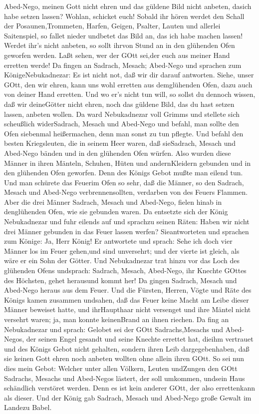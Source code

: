 Abed-Nego, meinen Gott nicht ehren und das güldene Bild nicht anbeten,
dasich habe setzen lassen?  Wohlan, schicket euch! Sobald
ihr hören werdet den Schall der Posaunen,Trommeten, Harfen, Geigen,
Psalter, Lauten und allerlei Saitenspiel, so fallet nieder undbetet das
Bild an, das ich habe machen lassen! Werdet ihr's nicht anbeten, so
sollt ihrvon Stund an in den glühenden Ofen geworfen werden. Laßt sehen,
wer der GOtt sei,der euch aus meiner Hand erretten werde! 
Da fingen an Sadrach, Mesach; Abed-Nego und sprachen zum
KönigeNebukadnezar: Es ist nicht not, daß wir dir darauf antworten.
 Siehe, unser GOtt, den wir ehren, kann uns wohl erretten
aus demglühenden Ofen, dazu auch von deiner Hand erretten. 
Und wo er's nicht tun will, so sollst du dennoch wissen, daß wir
deineGötter nicht ehren, noch das güldene Bild, das du hast setzen
lassen, anbeten wollen.  Da ward Nebukadnezar voll Grimms
und stellete sich scheußlich widerSadrach, Mesach und Abed-Nego und
befahl, man sollte den Ofen siebenmal heißermachen, denn man sonst zu
tun pflegte.  Und befahl den besten Kriegsleuten, die in
seinem Heer waren, daß sieSadrach, Mesach und Abed-Nego bänden und in
den glühenden Ofen würfen.  Also wurden diese Männer in
ihren Mänteln, Schuhen, Hüten und andernKleidern gebunden und in den
glühenden Ofen geworfen.  Denn des Königs Gebot mußte man
eilend tun. Und man schürete das Feuerim Ofen so sehr, daß die Männer,
so den Sadrach, Mesach und Abed-Nego verbrennensollten, verdarben von
des Feuers Flammen.  Aber die drei Männer Sadrach, Mesach
und Abed-Nego, fielen hinab in denglühenden Ofen, wie sie gebunden
waren.  Da entsetzte sich der König Nebukadnezar und fuhr
eilends auf und sprachzu seinen Räten: Haben wir nicht drei Männer
gebunden in das Feuer lassen werfen? Sieantworteten und sprachen zum
Könige: Ja, Herr König!  Er antwortete und sprach: Sehe ich
doch vier Männer los im Feuer gehen,und sind unversehrt; und der vierte
ist gleich, als wäre er ein Sohn der Götter.  Und
Nebukadnezar trat hinzu vor das Loch des glühenden Ofens undsprach:
Sadrach, Mesach, Abed-Nego, ihr Knechte GOttes des Höchsten, gehet
herausund kommt her! Da gingen Sadrach, Mesach und Abed-Nego heraus aus
dem Feuer.  Und die Fürsten, Herren, Vögte und Räte des
Königs kamen zusammen undsahen, daß das Feuer keine Macht am Leibe
dieser Männer beweiset hatte, und ihrHaupthaar nicht versenget und ihre
Mäntel nicht versehrt waren; ja, man konnte keinenBrand an ihnen
riechen.  Da fing an Nebukadnezar und sprach: Gelobet sei
der GOtt Sadrachs,Mesachs und Abed-Negos, der seinen Engel gesandt und
seine Knechte errettet hat, dieihm vertrauet und des Königs Gebot nicht
gehalten, sondern ihren Leib dargegebenhaben, daß sie keinen Gott ehren
noch anbeten wollten ohne allein ihren GOtt.  So sei nun
dies mein Gebot: Welcher unter allen Völkern, Leuten undZungen den GOtt
Sadrachs, Mesachs und Abed-Negos lästert, der soll umkommen, undsein
Haus schändlich verstöret werden. Denn es ist kein anderer GOtt, der
also errettenkann als dieser.  Und der König gab Sadrach,
Mesach und Abed-Nego große Gewalt im Landezu Babel.

